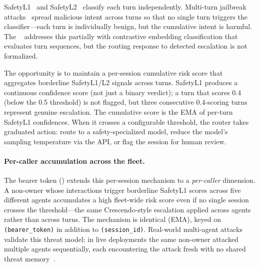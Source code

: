 \begin{opportunity}
\label{opp:cumulative-risk}
SafetyL1~\cite{safetyl1_2026} and SafetyL2~\cite{safetyl2_2026}
classify each turn independently.  Multi-turn jailbreak
attacks~\cite{vcd2026} spread malicious intent across turns so that
no single turn triggers the classifier---each turn is individually
benign, but the cumulative intent is harmful.  The
\vsr{}~\cite{vllmsr2026} addresses this partially with contrastive
embedding classification that evaluates turn sequences, but the
routing response to detected escalation is not formalized.

The opportunity is to maintain a per-session cumulative risk score
that aggregates borderline SafetyL1/L2 signals across turns.
SafetyL1 produces a continuous confidence score (not just a binary
verdict); a turn that scores 0.4 (below the 0.5 threshold) is
not flagged, but three consecutive 0.4-scoring turns represent
genuine escalation.  The cumulative score is the EMA of per-turn
SafetyL1 confidences.  When it crosses a configurable threshold,
the router takes graduated action: route to a safety-specialized
model, reduce the model's sampling temperature via the API, or
flag the session for human review.

\paragraph{Per-caller accumulation across the fleet.}
The bearer token () extends this
per-session mechanism to a \emph{per-caller} dimension.  A non-owner
whose interactions trigger borderline SafetyL1 scores across five
different agents accumulates a high fleet-wide risk score even if no
single session crosses the threshold---the same Crescendo-style
escalation applied across agents rather than across turns.  The
mechanism is identical (EMA), keyed on \texttt{(bearer\_token)} in
addition to \texttt{(session\_id)}.  Real-world multi-agent attacks
validate this threat model: in live deployments the same non-owner
attacked multiple agents sequentially, each encountering the attack
fresh with no shared threat memory~\cite{agentschaos2025}.


\end{opportunity}
